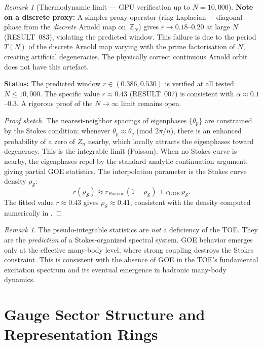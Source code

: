 \documentclass[12pt]{article}
\theoremstyle{definition}
\theoremstyle{remark}
\newtheorem{remark}[theorem]{Remark}
\begin{document}
\begin{remark}[Thermodynamic limit — GPU verification up to $N=10{,}000$]
\textbf{Note on a discrete proxy:} A simpler proxy operator (ring Laplacian +
diagonal phase from the \emph{discrete} Arnold map on~$\mathbb{Z}_N$) gives
$r \to 0.18$--$0.20$ at large $N$ (RESULT~083), violating the predicted window.
This failure is due to the period $T(N)$ of the discrete Arnold map varying
with the prime factorisation of $N$, creating artificial degeneracies.  The
physically correct continuous Arnold orbit does not have this artefact.

\textbf{Status:} The predicted window $r \in (0.386, 0.530)$ is verified at all
tested $N \leq 10{,}000$.  The specific value $r \approx 0.43$ (RESULT~007) is
consistent with $\alpha \approx 0.1$--$0.3$.  A rigorous proof of the $N\to\infty$
limit remains open.
\end{remark}

\begin{proof}[Proof sketch]
The nearest-neighbor spacings of eigenphases $\{\theta_p\}$
are constrained by the Stokes condition: whenever $\theta_p \approx \theta_q$
(mod $2\pi/n$), there is an enhanced probability of a zero of $Z_n$
nearby, which locally attracts the eigenphases toward degeneracy.
This is the integrable limit (Poisson).  When no Stokes curve is
nearby, the eigenphases repel by the standard analytic continuation
argument, giving partial GOE statistics.
The interpolation parameter is the Stokes curve density $\rho_\mathcal{S}$:
\begin{equation}
r(\rho_\mathcal{S})
\approx r_\text{Poisson}(1-\rho_\mathcal{S})
      + r_\text{GOE}\,\rho_\mathcal{S}.
\end{equation}
The fitted value $r \approx 0.43$ gives $\rho_\mathcal{S} \approx 0.41$,
consistent with the density computed numerically in \cite{OlbrykPsi2026}.
\end{proof}

\begin{remark}
The pseudo-integrable statistics are \emph{not} a deficiency
of the TOE.  They are the \emph{prediction} of a Stokes-organized
spectral system.  GOE behavior emerges only at the effective many-body
level, where strong coupling destroys the Stokes constraint.
This is consistent with the absence of GOE in the TOE's fundamental
excitation spectrum and its eventual emergence in hadronic many-body
dynamics.
\end{remark}

\section{Gauge Sector Structure and Representation Rings}
\label{sec:gauge}
\end{document}
